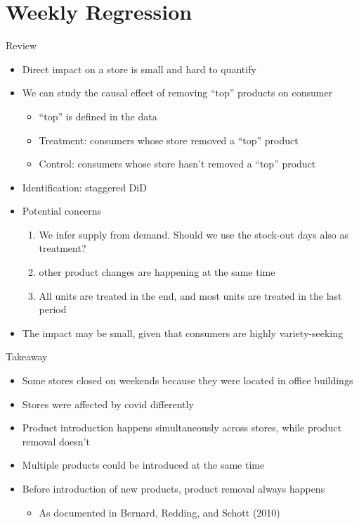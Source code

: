 \documentclass[aspectratio=169]{beamer}  %
\begin{document}
\section{Weekly Regression}
\begin{frame}{Review}
\begin{itemize}
    \item Direct impact on a store is small and hard to quantify
    \item We can study the causal effect of removing ``top'' products on consumer
    \begin{itemize}
        \item ``top'' is defined in the data
        \item Treatment: consumers whose store removed a ``top'' product
        \item Control: consumers whose store hasn't removed a ``top'' product
    \end{itemize}
    \item Identification: staggered DiD
    \item Potential concerns
    \begin{enumerate}
        \item We infer supply from demand. Should we use the stock-out days also as treatment?
        \item other product changes are happening at the same time
        \item All units are treated in the end, and most units are treated in the last period
    \end{enumerate}
    \item The impact may be small, given that consumers are highly variety-seeking
\end{itemize}    
\end{frame}



\begin{frame}{Takeaway}
\begin{itemize}
    \item Some stores closed on weekends because they were located in office buildings
    \item Stores were affected by covid differently
    \item Product introduction happens simultaneously across stores, while product removal doesn't
    \item Multiple products could be introduced at the same time
    \item Before introduction of new products, product removal always happens
    \begin{itemize}
        \item As documented in Bernard, Redding, and Schott (2010)
    \end{itemize}
\end{itemize}    
\end{frame}
\end{document}
